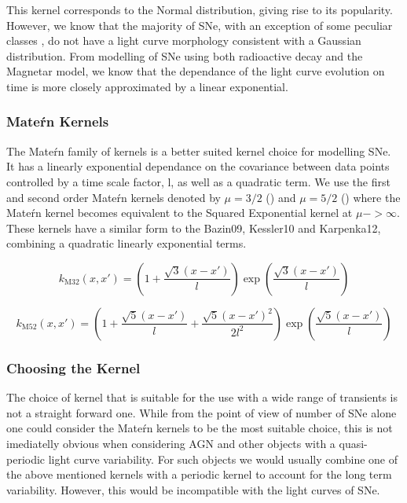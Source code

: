 This kernel corresponds to the Normal distribution, giving rise to its popularity. However, we know that the majority of SNe, with an exception of some peculiar classes \citep{Pursiainen2018}, do not have a light curve morphology consistent with a Gaussian distribution. From modelling of SNe using both radioactive decay and the Magnetar model, we know that the dependance of the light curve evolution on time is more closely approximated by a linear exponential.

\subsubsection{Mate\'rn Kernels}
The Mate\'rn family of kernels is a better suited kernel choice for modelling SNe. It has a linearly exponential dependance on the covariance between data points controlled by a time scale factor, l, as well as a quadratic term. We use the first and second order Mate\'rn kernels denoted by $\mu = 3/2$ () and $\mu = 5/2$ () where the Mate\'rn kernel becomes equivalent to the Squared Exponential kernel at $\mu -> \infty$. These kernels have a similar form to the Bazin09, Kessler10 and Karpenka12, combining a quadratic linearly exponential terms.

\begin{equation} \label{eq:M32}
  k_{\textrm{M32}}(x,x') = \left(1 + \frac{\sqrt{3}(x - x')}{l}\right) \exp \left( \frac{\sqrt{3}(x - x')}{l} \right)
\end{equation}

\begin{equation} \label{eq:M52}
  k_{\textrm{M52}}(x,x') = \left(1 + \frac{\sqrt{5}(x - x')}{l} + \frac{\sqrt{5}(x - x')^2}{2l^2}\right) \exp \left( \frac{\sqrt{5}(x - x')}{l} \right)
\end{equation}

\subsubsection{Choosing the Kernel}
The choice of kernel that is suitable for the use with a wide range of transients is not a straight forward one. While from the point of view of number of SNe alone one could consider the Mate\'rn kernels to be the most suitable choice, this is not imediatelly obvious when considering AGN and other objects with a quasi-periodic light curve variability. For such objects we would usually combine one of the above mentioned kernels with a periodic kernel to account for the long term variability. However, this would be incompatible with the light curves of SNe.


